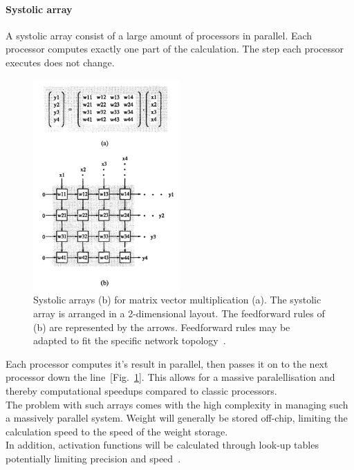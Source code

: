 \documentclass[conference]{IEEEtran}
\begin{document}
    \paragraph{Systolic array}

    A systolic array consist of a large amount of processors in parallel.
    Each processor computes exactly one part of the calculation.
    The step each processor executes does not change.

    \begin{figure}
        \centering
        \includegraphics[width=0.5\textwidth]{resources/sysarray2.jpg}
        \caption{Systolic arrays (b) for matrix vector multiplication (a).
        The systolic array is arranged in a 2-dimensional layout.
        The feedforward rules of (b) are represented by the arrows.
        Feedforward rules may be adapted to fit the specific network topology~\cite[Fig.~2]{chung1992systolic}.}
        \label{fig:sysarray}
    \end{figure}

    Each processor computes it's result in parallel, then passes it on to the next processor down the line~[Fig.~\ref{fig:sysarray}].
    This allows for a massive paralellisation and thereby computational speedups compared to classic processors. \\
    The problem with such arrays comes with the high complexity in managing such a massively parallel system.
    Weight will generally be stored off-chip, limiting the calculation speed to the speed of the weight storage.\\
    In addition, activation functions will be calculated through look-up tables potentially limiting precision and speed~\cite{dias2004artificial}.
\end{document}
